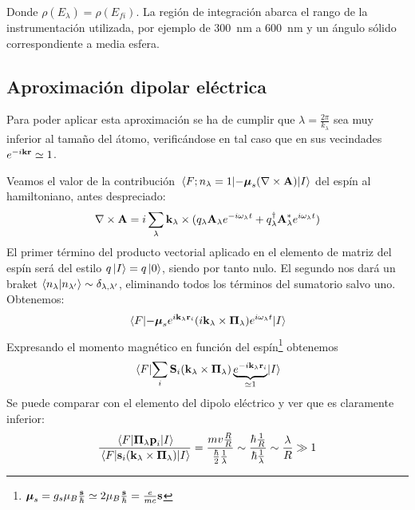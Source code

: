 Donde $\rho(E_\lambda) = \rho(E_{fi})$. La región de integración
abarca el rango de la instrumentación utilizada, por ejemplo de
\SI{300}{\nano\metre} a \SI{600}{\nano\metre} y un ángulo sólido
correspondiente a media esfera. 




\subsection{Aproximación dipolar eléctrica}
Para poder aplicar esta aproximación se ha de cumplir que
$\lambda=\frac{2\pi}{k_\lambda}$ sea muy inferior al tamaño del átomo,
verificándose en tal caso que en sus vecindades $e^{-i
  \bm{\mathrm{k}}\bm{\mathrm{r}}}\simeq 1$.

Veamos el valor de la contribución
$\mel{F;n_\lambda=1}{-\bm{\mathrm{\mu}}_s (\nabla\times \bm{\mathrm{A}})}{I}$ del espín al hamiltoniano, antes
despreciado:
\begin{equation}
  \nabla\times \bm{\mathrm{A}} = i \sum_{\lambda} \bm{\mathrm{k}}_\lambda\times
  (q_\lambda \bm{\mathrm{A}}_\lambda e^{-i\omega_\lambda t} +
  q_\lambda^\dagger \bm{\mathrm{A}}_\lambda^* e^{i\omega_\lambda t})
\end{equation}
El primer término del producto vectorial aplicado en el elemento de
matriz del espín será del estilo $q\ket{I}=q\ket{0}$, siendo por
tanto nulo. El segundo nos dará un braket
$\braket{n_\lambda}{n_{\lambda'}} \sim \delta_{\lambda,\lambda'}$, eliminando todos los términos del
sumatorio salvo uno. Obtenemos:
\begin{equation}
  \mel{F}{-\bm{\mathrm{\mu}}_s e^{i \bm{\mathrm{k}}_\lambda \bm{\mathrm{r}}_i } (i
    \bm{\mathrm{k}}_\lambda \times \bm{\mathrm{\Pi}}_\lambda) e^{i
      \omega_\lambda t}}{I}
\end{equation}
Expresando el momento magnético en función del
espín\footnote{$\bm{\mathrm{\mu}}_s = g_s \mu_{\scriptstyle B}
  \frac{\bm{\mathrm{s}}}{\hbar}\simeq 2 \mu_{\scriptstyle B}
  \frac{\bm{\mathrm{s}}}{\hbar} = \frac{e}{mc} \bm{\mathrm{s}}$} obtenemos
\begin{equation}
  \mel{F}{
    \sum_{i} \bm{\mathrm{S}}_i (\bm{\mathrm{k}}_\lambda \times
    \bm{\mathrm{\Pi}}_\lambda) \underbrace{e^{-i \bm{\mathrm{k}}_\lambda
        \bm{\mathrm{r}}_i}}_{\simeq 1}
}{I}
\end{equation}
Se puede comparar con el elemento del dipolo eléctrico y ver que es
claramente inferior:
\begin{equation}
  \frac{\mel{F}{\bm{\mathrm{\Pi}}_\lambda
      \bm{\mathrm{p}}_i}{I}}{\mel{F}{\bm{\mathrm{s}}_i (\bm{\mathrm{k}}_\lambda
      \times \bm{\mathrm{\Pi}}_\lambda)}{I}} = \frac{mv
    \frac{R}{R}}{\frac{\hbar}{2} \frac{1}{\lambda}} \sim \frac{\hbar
    \frac{1}{R}}{\hbar \frac{1}{\lambda}} \sim \frac{\lambda}{R} \gg 1
\end{equation}

